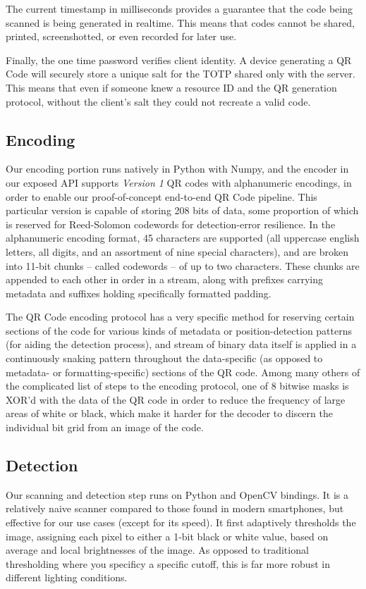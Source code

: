 \documentclass[10pt,twocolumn,letterpaper]{article}
\begin{document}
The current timestamp in milliseconds provides a guarantee that the code being scanned is being generated in realtime. This means that codes cannot be shared, printed, screenshotted, or even recorded for later use.

Finally, the one time password verifies client identity. A device generating a QR Code will securely store a unique salt for the TOTP shared only with the server. This means that even if someone knew a resource ID and the QR generation protocol, without the client's salt they could not recreate a valid code.

\subsection{Encoding}
Our encoding portion runs natively in Python with Numpy, and the encoder in our exposed API supports \emph{Version 1} QR codes with alphanumeric encodings, in order to enable our proof-of-concept end-to-end QR Code pipeline. This particular version is capable of storing 208 bits of data, some proportion of which is reserved for Reed-Solomon codewords for detection-error resilience. In the alphanumeric encoding format, 45 characters are supported (all uppercase english letters, all digits, and an assortment of nine special characters), and are broken into 11-bit chunks – called codewords – of up to two characters. These chunks are appended to each other in order in a stream, along with prefixes carrying metadata and suffixes holding specifically formatted padding.

The QR Code encoding protocol has a very specific method for reserving certain sections of the code for various kinds of metadata or position-detection patterns (for aiding the detection process), and stream of binary data itself is applied in a continuously snaking pattern throughout the data-specific (as opposed to metadata- or formatting-specific) sections of the QR code. Among many others of the complicated list of steps to the encoding protocol, one of 8 bitwise masks is XOR'd with the data of the QR code in order to reduce the frequency of large areas of white or black, which make it harder for the decoder to discern the individual bit grid from an image of the code.

\subsection{Detection}

Our scanning and detection step runs on Python and OpenCV bindings. It is a relatively naive scanner compared to those found in modern smartphones, but effective for our use cases (except for its speed). It first adaptively thresholds the image, assigning each pixel to either a 1-bit black or white value, based on average and local brightnesses of the image. As opposed to traditional thresholding where you specificy a specific cutoff, this is far more robust in different lighting conditions.
\end{document}
